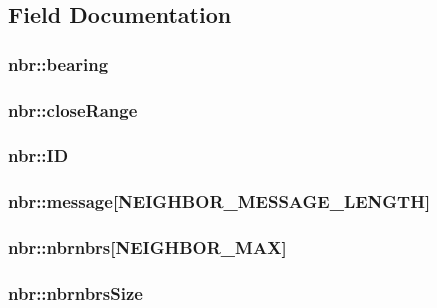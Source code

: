 \subsection{Field Documentation}
\hypertarget{structnbr_afea3a6ad44a6e5c5f0d45a4f19942831}{
\subsubsection[{bearing}]{ {\bf nbr::bearing}}}
\label{structnbr_afea3a6ad44a6e5c5f0d45a4f19942831}
\hypertarget{structnbr_ad87189c876732d9eef4643a13fb4e5bd}{
\subsubsection[{closeRange}]{ {\bf nbr::closeRange}}}
\label{structnbr_ad87189c876732d9eef4643a13fb4e5bd}
\hypertarget{structnbr_a91116d848e5fd7311aab72a19640fd33}{
\subsubsection[{ID}]{ {\bf nbr::ID}}}
\label{structnbr_a91116d848e5fd7311aab72a19640fd33}
\hypertarget{structnbr_a11a5527cffa99f3eb060b4efd4cc26e8}{
\subsubsection[{message}]{ {\bf nbr::message}\mbox{[}NEIGHBOR\_\-MESSAGE\_\-LENGTH\mbox{]}}}
\label{structnbr_a11a5527cffa99f3eb060b4efd4cc26e8}
\hypertarget{structnbr_a20de230398a34fcd2958fa26884f4d67}{
\subsubsection[{nbrnbrs}]{ {\bf nbr::nbrnbrs}\mbox{[}NEIGHBOR\_\-MAX\mbox{]}}}
\label{structnbr_a20de230398a34fcd2958fa26884f4d67}
\hypertarget{structnbr_a6c7ea3d28f851ec31c8e0e3701a1a881}{
\subsubsection[{nbrnbrsSize}]{ {\bf nbr::nbrnbrsSize}}}
